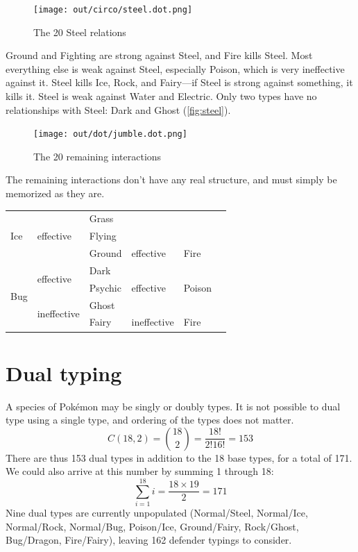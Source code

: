 \begin{figure}[h!]
\centering
\texttt{[image: out/circo/steel.dot.png]}
\caption{The 20 Steel relations}
\label{fig:steel}
\end{figure}
\noindent{}Ground and Fighting are strong against Steel, and Fire kills Steel.
Most everything else is weak against Steel, especially
 Poison, which is very ineffective against it.
Steel kills Ice, Rock, and Fairy---if Steel is strong against something, it kills it.
Steel is weak against Water and Electric.
Only two types have no relationships with Steel: Dark and Ghost (\autoref{fig:steel}).

\begin{figure}[ht]
\centering
\texttt{[image: out/dot/jumble.dot.png]}
\caption{The 20 remaining interactions}
\end{figure}
The remaining interactions don't have any real structure, and must simply be
memorized as they are.

\begin{table}[ht]
  \begin{center}
    \begin{tabular}{llllll}
      \hline
      \multirow{3}{*}{Ice} & \multirow{3}{*}{effective} & Grass & & \\
      & & Flying & & \\
      & & Ground & effective & Fire \\
      \hline
      \multirow{4}{*}{Bug} & \multirow{2}{*}{effective} & Dark & & \\
      & & Psychic & effective & Poison \\
      & \multirow{2}{*}{ineffective} & Ghost \\
      & & Fairy & ineffective & Fire \\
      \hline
    \end{tabular}
  \end{center}
\end{table}

\section{Dual typing}
\label{section:dualtypes}
A species of Pokémon may be singly or doubly types.
It is not possible to dual type using a single type,
 and ordering of the types does not matter.
\[ C(18, 2) = \binom{18}{2} = \frac{18!}{2!16!} = 153 \]
There are thus 153 dual types in addition to the 18 base types,
  for a total of 171.
We could also arrive at this number by summing 1 through 18:
\[ \sum_{i=1}^{18} i = \frac{18 \times 19}{2} = 171 \]
Nine dual types are currently unpopulated (Normal/Steel, Normal/Ice, Normal/Rock,
 Normal/Bug, Poison/Ice, Ground/Fairy, Rock/Ghost, Bug/Dragon, Fire/Fairy),
 leaving 162 defender typings to consider.

